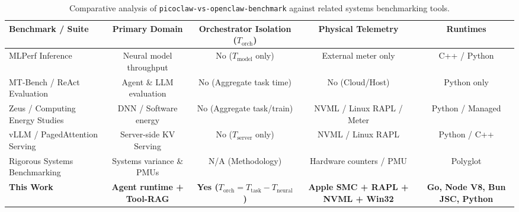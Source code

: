 \documentclass[preprint,12pt,3p]{elsarticle}
\begin{document}
\begin{table}[h!]
\small
\centering
\begin{tabular}{lcccc}
\toprule
\textbf{Benchmark / Suite} & \textbf{Primary Domain} & \textbf{Orchestrator Isolation ($T_{\text{orch}}$)} & \textbf{Physical Telemetry} & \textbf{Runtimes} \\
\midrule
MLPerf Inference \cite{reddi2020mlperf} & Neural model throughput & No ($T_{\text{model}}$ only) & External meter only & C++ / Python \\
MT-Bench / ReAct Evaluation \cite{yao2023react, zheng2023judging} & Agent \& LLM evaluation & No (Aggregate task time) & No (Cloud/Host) & Python only \\
Zeus / Computing Energy Studies \cite{you2023zeus, fahad2019comparative} & DNN / Software energy & No (Aggregate task/train) & NVML / Linux RAPL / Meter & Python / Managed \\
vLLM / PagedAttention Serving \cite{kwon2023vllm} & Server-side KV Serving & No ($T_{\text{server}}$ only) & NVML / Linux RAPL & Python / C++ \\
Rigorous Systems Benchmarking \cite{kalibera2013rigorous, hoefler2015scientific, maricq2018taming, weaver2013nondeterminism} & Systems variance \& PMUs & N/A (Methodology) & Hardware counters / PMU & Polyglot \\
\textbf{This Work} & \textbf{Agent runtime + Tool-RAG} & \textbf{Yes ($T_{\text{orch}} = T_{\text{task}} - T_{\text{neural}}$)} & \textbf{Apple SMC + RAPL + NVML + Win32} & \textbf{Go, Node V8, Bun JSC, Python} \\
\bottomrule
\end{tabular}
\caption{Comparative analysis of \texttt{picoclaw-vs-openclaw-benchmark} against related systems benchmarking tools.}
\label{tab:related_tools}
\end{table}
\end{document}
